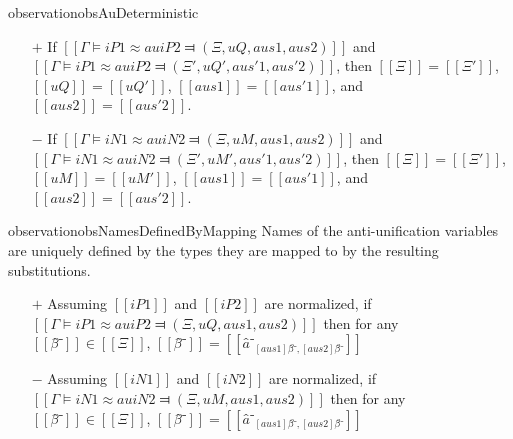 \begin{restatable}{observation}{obsAuDeterministic}
    \label{obs:au-deterministic}
    \hfill\\
    \begin{itemize}
        \item [$+$] If $[[Γ ⊨ iP1 ≈au iP2 ⫤ (Ξ, uQ, aus1, aus2)]]$ and 
        $[[Γ ⊨ iP1 ≈au iP2 ⫤ (Ξ', uQ', aus'1, aus'2)]]$,
        then $[[Ξ]] = [[Ξ']]$, $[[uQ]] = [[uQ']]$, $[[aus1]] = [[aus'1]]$, and $[[aus2]] = [[aus'2]]$.
        \item [$-$] If $[[Γ ⊨ iN1 ≈au iN2 ⫤ (Ξ, uM, aus1, aus2)]]$ and
        $[[Γ ⊨ iN1 ≈au iN2 ⫤ (Ξ', uM', aus'1, aus'2)]]$,
        then $[[Ξ]] = [[Ξ']]$, $[[uM]] = [[uM']]$, $[[aus1]] = [[aus'1]]$, and $[[aus2]] = [[aus'2]]$.
    \end{itemize}
\end{restatable}

\begin{restatable}{observation}{obsNamesDefinedByMapping}
    \label{obs:names-defined-by-mapping}
    Names of the anti-unification variables are uniquely defined by
    the types they are mapped to by the resulting substitutions. 

    \begin{itemize}
        \item [$+$]  Assuming $[[iP1]]$ and $[[iP2]]$ are normalized,
        if $[[Γ ⊨ iP1 ≈au iP2 ⫤ (Ξ, uQ, aus1, aus2)]]$
        then for any $[[β̂⁻]] \in [[Ξ]]$,
        $[[β̂⁻]] = [[â⁻_{[aus1]β̂⁻, [aus2]β̂⁻}]]$
        \item [$-$]  Assuming $[[iN1]]$ and $[[iN2]]$ are normalized,
        if $[[Γ ⊨ iN1 ≈au iN2 ⫤ (Ξ, uM, aus1, aus2)]]$
        then for any $[[β̂⁻]] \in [[Ξ]]$,
        $[[β̂⁻]] = [[â⁻_{[aus1]β̂⁻, [aus2]β̂⁻}]]$
    \end{itemize}
\end{restatable}

